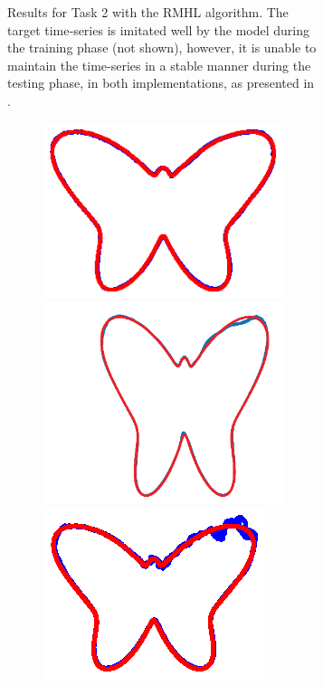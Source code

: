 \begin{figure}
\begin{subfigure}{\textwidth}
\begin{subfigure}{\textwidth}
        \end{subfigure}
        
    \caption{Results for Task 2 with the RMHL algorithm. The target time‐series is imitated well by the model during the training phase (not shown), however, it is unable to maintain the time-series in a stable manner during the testing phase, in both implementations, as presented in \cite{pyle2019}.}
    \label{Fig:compTask2RMHL}
    \end{subfigure}
    
    \begin{subfigure}{\textwidth}
        \centering
        
        \textbf{}\begin{subfigure}{\textwidth}
        \centering
        
        \includegraphics[trim=4cm 4cm 4cm 4.5cm, clip=true,height=.2\linewidth]{Figures/Fig_T3/MATLAB/ST_T2_Seg2_Trajectory.eps}
        \hspace{2em}
        \includegraphics[trim=1cm 0cm 0cm 0cm, clip=true,height=.2\linewidth]{Figures/Fig_T3/Orig/ST_T2_Trajectory.png}
        \hspace{0em}
        \includegraphics[trim=6cm 4.5cm 6cm 5cm, clip=true,height=.2\linewidth]{Figures/Fig_T3/Python/ST_T2_Seg2_Trajectory.eps}
        
        \end{subfigure}
        
        
        \textbf{}\begin{subfigure}{\textwidth}
        \centering
        

\end{subfigure}
\end{subfigure}
\end{figure}
